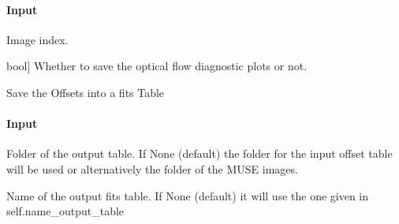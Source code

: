 \documentclass[letterpaper,10pt,english]{sphinxmanual}
\begin{document}
\begin{fulllineitems}
\begin{fulllineitems}
\paragraph{Input}
\label{\detokenize{api/pymusepipe:id24}}\begin{description}
\sphinxAtStartPar
Image index.

\sphinxlineitem{save\_plot}{[}bool{]}
\sphinxAtStartPar
Whether to save the optical flow diagnostic plots or not.

\end{description}

\end{fulllineitems}


\begin{fulllineitems}
\label{\detokenize{api/pymusepipe:pymusepipe.align_pipe.AlignMuseDataset.save_fits_offset_table}}
\pysigstartsignatures
{}
\pysigstopsignatures
\sphinxAtStartPar
Save the Offsets into a fits Table


\paragraph{Input}
\label{\detokenize{api/pymusepipe:id25}}\begin{description}
\sphinxAtStartPar
Folder of the output table. If None (default) the folder
for the input offset table will be used or alternatively
the folder of the MUSE images.

\sphinxAtStartPar
Name of the output fits table. If None (default) it will
use the one given in self.name\_output\_table


\end{description}
\end{fulllineitems}
\end{fulllineitems}
\end{document}
